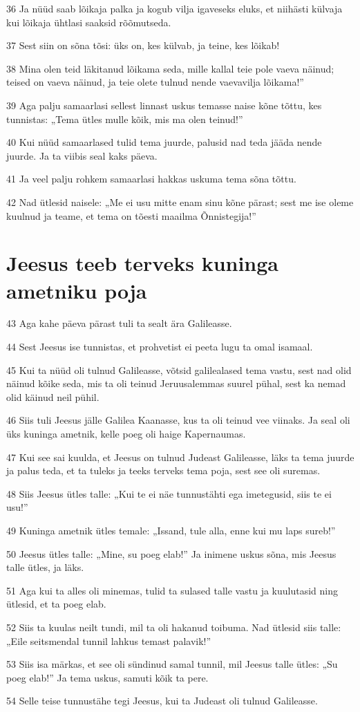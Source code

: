 \par 36 Ja nüüd saab lõikaja palka ja kogub vilja igaveseks eluks, et niihästi külvaja kui lõikaja ühtlasi saaksid rõõmutseda.
\par 37 Sest siin on sõna tõsi: üks on, kes külvab, ja teine, kes lõikab!
\par 38 Mina olen teid läkitanud lõikama seda, mille kallal teie pole vaeva näinud; teised on vaeva näinud, ja teie olete tulnud nende vaevavilja lõikama!”
\par 39 Aga palju samaarlasi sellest linnast uskus temasse naise kõne tõttu, kes tunnistas: „Tema ütles mulle kõik, mis ma olen teinud!”
\par 40 Kui nüüd samaarlased tulid tema juurde, palusid nad teda jääda nende juurde. Ja ta viibis seal kaks päeva.
\par 41 Ja veel palju rohkem samaarlasi hakkas uskuma tema sõna tõttu.
\par 42 Nad ütlesid naisele: „Me ei usu mitte enam sinu kõne pärast; sest me ise oleme kuulnud ja teame, et tema on tõesti maailma Õnnistegija!”

\section*{Jeesus teeb terveks kuninga ametniku poja}

\par 43 Aga kahe päeva pärast tuli ta sealt ära Galileasse.
\par 44 Sest Jeesus ise tunnistas, et prohvetist ei peeta lugu ta omal isamaal.
\par 45 Kui ta nüüd oli tulnud Galileasse, võtsid galilealased tema vastu, sest nad olid näinud kõike seda, mis ta oli teinud Jeruusalemmas suurel pühal, sest ka nemad olid käinud neil pühil.
\par 46 Siis tuli Jeesus jälle Galilea Kaanasse, kus ta oli teinud vee viinaks. Ja seal oli üks kuninga ametnik, kelle poeg oli haige Kapernaumas.
\par 47 Kui see sai kuulda, et Jeesus on tulnud Judeast Galileasse, läks ta tema juurde ja palus teda, et ta tuleks ja teeks terveks tema poja, sest see oli suremas.
\par 48 Siis Jeesus ütles talle: „Kui te ei näe tunnustähti ega imetegusid, siis te ei usu!”
\par 49 Kuninga ametnik ütles temale: „Issand, tule alla, enne kui mu laps sureb!”
\par 50 Jeesus ütles talle: „Mine, su poeg elab!” Ja inimene uskus sõna, mis Jeesus talle ütles, ja läks.
\par 51 Aga kui ta alles oli minemas, tulid ta sulased talle vastu ja kuulutasid ning ütlesid, et ta poeg elab.
\par 52 Siis ta kuulas neilt tundi, mil ta oli hakanud toibuma. Nad ütlesid siis talle: „Eile seitsmendal tunnil lahkus temast palavik!”
\par 53 Siis isa märkas, et see oli sündinud samal tunnil, mil Jeesus talle ütles: „Su poeg elab!” Ja tema uskus, samuti kõik ta pere.
\par 54 Selle teise tunnustähe tegi Jeesus, kui ta Judeast oli tulnud Galileasse.


